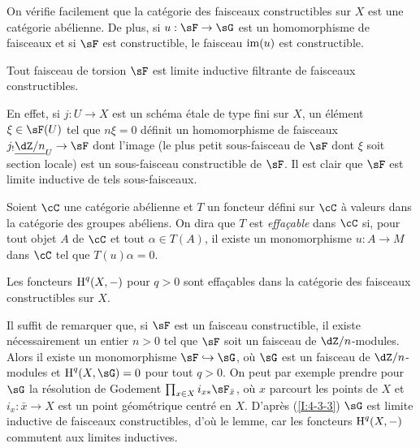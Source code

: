 On vérifie facilement que la catégorie des faisceaux constructibles sur $X$ 
est une catégorie abélienne. De plus, si $u:\sF\to \sG$ est un homomorphisme de 
faisceaux et si $\sF$ est constructible, le faisceau $\operatorname{im}(u)$ est constructible.





\begin{lemma}\label{I:4-3-3}
Tout faisceau de torsion $\sF$ est limite inductive filtrante de faisceaux 
constructibles.
\end{lemma}

En effet, si $j:U\to X$ est un schéma étale de type fini sur $X$, un 
élément $\xi\in \sF(U)$ tel que $n\xi=0$ définit un homomorphisme de 
faisceaux $j_! \const{\dZ/n}_U\to \sF$ dont l'image (le plus petit sous-faisceau de 
$\sF$ dont $\xi$ soit section locale) est un sous-faisceau constructible de $\sF$. 
Il est clair que $\sF$ est limite inductive de tels sous-faisceaux.





\begin{definition}\label{I:4-3-4}
Soient $\cC$ une catégorie abélienne et $T$ un foncteur défini sur $\cC$ 
à valeurs dans la catégorie des groupes abéliens. On dira que $T$ est 
\emph{effaçable} dans $\cC$ si, pour tout objet $A$ de $\cC$ et tout 
$\alpha\in T(A)$, il existe un monomorphisme $u:A\to M$ dans $\cC$ tel que 
$T(u)\alpha = 0$. 
\end{definition}





\begin{lemma}\label{I:4-3-5}
Les foncteurs $\operatorname{H}^q(X,-)$ pour $q>0$ sont effaçables dans la catégorie des 
faisceaux constructibles sur $X$.
\end{lemma}

Il suffit de remarquer que, si $\sF$ est un faisceau constructible, il existe 
nécessairement un entier $n>0$ tel que $\sF$ soit un faisceau de 
$\dZ/n$-modules. Alors il existe un monomorphisme $\sF\hookrightarrow \sG$, où 
$\sG$ est un faisceau de $\dZ/n$-modules et $\h^q(X,\sG) = 0$ pour tout $q>0$.  
On peut par exemple prendre pour $\sG$ la résolution de Godement 
$\prod_{x\in X} i_{x*} \sF_{\bar x}$, où $x$ parcourt les points de $X$ et 
$i_x:\bar x\to X$ est un point géométrique centré en $X$. D'après 
(\ref{I:4-3-3}) $\sG$ est limite inductive de faisceaux constructibles, d'où le 
lemme, car les foncteurs $\operatorname{H}^q(X,-)$ commutent aux limites inductives. 





